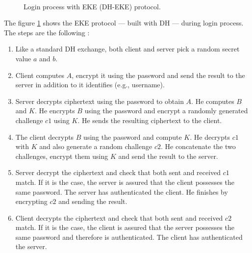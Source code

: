 ﻿\documentclass[../report.tex]{subfiles}
\begin{document}
\paragraph{}
\begin{figure}[h]
 \centering
 \setlength{\fboxsep}{10pt}
 \setlength{\fboxrule}{1pt}
 \caption{Login process with EKE (DH-EKE) protocol.}
 \label{fig:EKE_DH}
\end{figure}
The figure \ref{fig:EKE_DH} shows the EKE protocol --- built with DH ---  during login process.
The steps are the following :
\begin{enumerate}
 \item Like a standard DH exchange, both client and server pick a random secret value $a$ and $b$.
 \item Client computes $A$, encrypt it using the password and send the result to the server in addition to it identifies (e.g., username).
 \item Server decrypts ciphertext using the password to obtain $A$. He computes $B$ and $K$. He encrypts $B$ using the password and encrypt a randomly generated challenge $c1$ using $K$. He sends the resulting ciphertext to the client.
 \item The client decrypts $B$ using the password and compute $K$. He decrypts $c1$ with $K$ and also generate a random challenge $c2$. He concatenate the two challenges, encrypt them using $K$ and send the result to the server.
 \item Server decrypt the ciphertext and check that both sent and received $c1$ match. If it is the case, the server is assured that the client possesses the same password. The server has authenticated the client. He finishes by encrypting $c2$ and sending the result.
 \item Client decrypts the ciphertext and check that both sent and received $c2$ match. If it is the case, the client is assured that the server possesses the same password and therefore is authenticated. The client has authenticated the server.
\end{enumerate}
\end{document}
